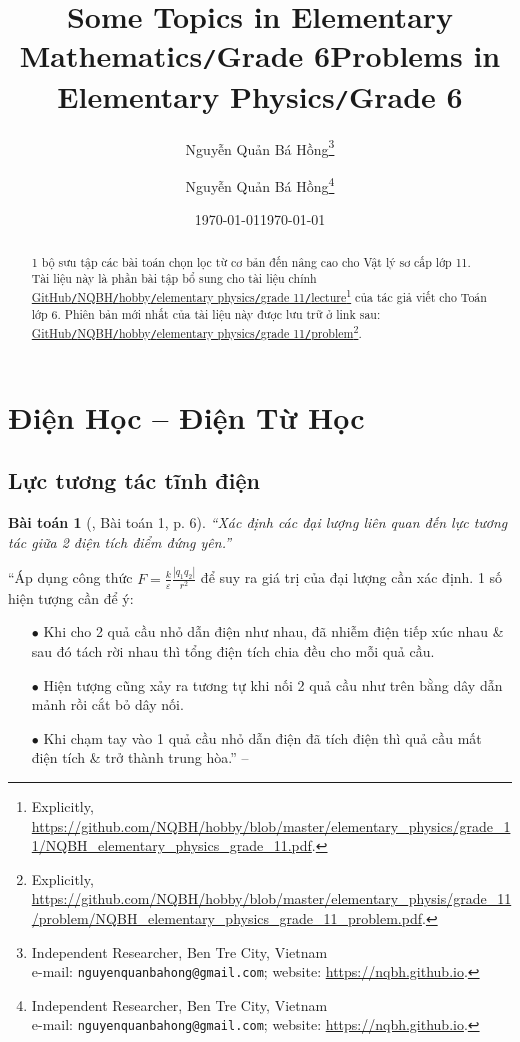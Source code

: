 \documentclass{article}
\title{Some Topics in Elementary Mathematics\texttt{/}Grade 6}
\author{Nguyễn Quản Bá Hồng\footnote{Independent Researcher, Ben Tre City, Vietnam\\e-mail: \texttt{nguyenquanbahong@gmail.com}; website: \url{https://nqbh.github.io}.}}
\date{\today}
\title{Problems in Elementary Physics\texttt{/}Grade 6}
\author{Nguyễn Quản Bá Hồng\footnote{Independent Researcher, Ben Tre City, Vietnam\\e-mail: \texttt{nguyenquanbahong@gmail.com}; website: \url{https://nqbh.github.io}.}}
\date{\today}
\numberwithin{equation}{section}
\newtheorem{baitoan}{Bài toán}[section]
\begin{document}
\maketitle
\begin{abstract}
	1 bộ sưu tập các bài toán chọn lọc từ cơ bản đến nâng cao cho Vật lý sơ cấp lớp 11. Tài liệu này là phần bài tập bổ sung cho tài liệu chính \href{https://github.com/NQBH/hobby/blob/master/elementary_physics/grade_11/NQBH_elementary_physics_grade_11.pdf}{GitHub\texttt{/}NQBH\texttt{/}hobby\texttt{/}elementary physics\texttt{/}grade 11\texttt{/}lecture}\footnote{Explicitly, \url{https://github.com/NQBH/hobby/blob/master/elementary_physics/grade_11/NQBH_elementary_physics_grade_11.pdf}.} của tác giả viết cho Toán lớp 6. Phiên bản mới nhất của tài liệu này được lưu trữ ở link sau: \href{https://github.com/NQBH/hobby/blob/master/elementary_physis/grade_11/problem/NQBH_elementary_physics_grade_11_problem.pdf}{GitHub\texttt{/}NQBH\texttt{/}hobby\texttt{/}elementary physics\texttt{/}grade 11\texttt{/}problem}\footnote{Explicitly, \url{https://github.com/NQBH/hobby/blob/master/elementary_physis/grade_11/problem/NQBH_elementary_physics_grade_11_problem.pdf}.}.
\end{abstract}
\tableofcontents
\newpage

\section{Điện Học -- Điện Từ Học}

\subsection{Lực tương tác tĩnh điện}

\begin{baitoan}[\cite{Giai_Toan_Vat_Ly_11_tap_1}, Bài toán 1, p. 6]
	``Xác định các đại lượng liên quan đến lực tương tác giữa 2 điện tích điểm đứng yên.''
\end{baitoan}
``Áp dụng công thức $F = \frac{k}{\varepsilon}\frac{|q_1q_2|}{r^2}$ để suy ra giá trị của đại lượng cần xác định. 1 số hiện tượng cần để ý:
\begin{enumerate}
	\item[$\bullet$] Khi cho 2 quả cầu nhỏ dẫn điện như nhau, đã nhiễm điện tiếp xúc nhau \& sau đó tách rời nhau thì tổng điện tích chia đều cho mỗi quả cầu.
	\item[$\bullet$] Hiện tượng cũng xảy ra tương tự khi nối 2 quả cầu như trên bằng dây dẫn mảnh rồi cắt bỏ dây nối.
	\item[$\bullet$] Khi chạm tay vào 1 quả cầu nhỏ dẫn điện đã tích điện thì quả cầu mất điện tích \& trở thành trung hòa.'' -- \cite[p. 7]{Giai_Toan_Vat_Ly_11_tap_1}
\end{enumerate}
\end{document}
